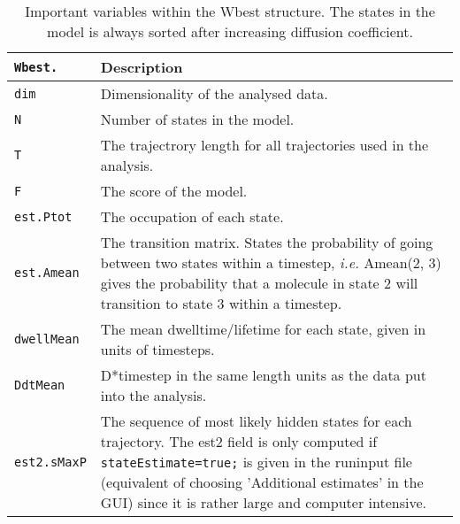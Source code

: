 \begin{table}[ht]
\caption{Important variables within the Wbest structure. The states in the model is always sorted after increasing diffusion coefficient.} 
\centering 
\begin{tabular*}{13.1cm}{ | m{2.7cm} | m{9.5cm} | } 
\hline
\texttt{Wbest.} & \textbf{Description} \\ [0.5ex] 
\hline \hline 
\texttt{dim} 						& Dimensionality of the analysed data.\\[0.5ex]   \hline 
\texttt{N}  						& Number of states in the model.\\[0.5ex]  \hline 
\texttt{T}							& The trajectrory length for all trajectories used in the analysis.\\[0.5ex]  \hline 
\texttt{F}						 	& The score of the model.\\[0.5ex]  \hline 
\texttt{est.Ptot}				& The occupation of each state.\\[0.5ex]  \hline 
\texttt{est.Amean}			& The transition matrix. States the probability of going between two states within a timestep, \textit{i.e.} Amean(2, 3) gives the probability that a molecule in state 2 will transition to state 3 within a timestep.\\[0.5ex]  \hline 
\texttt{dwellMean}			& The mean dwelltime/lifetime for each state, given in units of timesteps.\\[0.5ex]  \hline 
\texttt{DdtMean}				& D*timestep in the same length units as the data put into the analysis.\\[0.5ex]  \hline 
\texttt{est2.sMaxP}			& The sequence of most likely hidden states for each trajectory. The est2 field is only computed if \texttt{stateEstimate=true;} is given in the runinput file (equivalent of choosing 'Additional estimates' in the GUI) since it is rather large and computer intensive. \\[1ex] %
\hline 
\end{tabular*}\label{Tab:Wbest} 
\end{table}

\newpage

